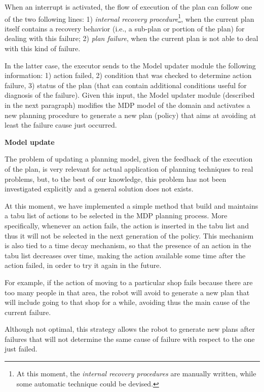 When an interrupt is activated, the flow of execution of the plan can follow one of the two following lines: 1) \emph{internal recovery procedure}\footnote{At this moment, the \emph{internal recovery procedures} are manually written, while some automatic technique could be devised.}, when the current plan itself contains a recovery behavior (i.e., a sub-plan or portion of the plan) for dealing with this failure; 2) \emph{plan failure}, when the current plan is not able to deal with this kind of failure.

In the latter case, the executor sends to the Model updater module the following information:
1) action failed, 2) condition that was checked to determine action failure, 3) status of the plan (that can contain additional conditions useful for diagnosis of the failure).
Given this input, the Model updater module (described in the next paragraph) modifies the MDP model of the domain and activates a new planning procedure to generate a new plan (policy) that aims at avoiding at least the failure cause just occurred.

\vspace{1em}

\noindent
{\bf Model update}

The problem of updating a planning model, given the feedback of the execution of the plan, is very relevant for actual application of planning techniques to real problems, but, to the best of our knowledge, this problem has not been investigated explicitly and a general solution does not exists.

At this moment, we have implemented a simple method that build and maintains a tabu list of actions to be selected in the MDP planning process.
More specifically, whenever an action fails, the action is inserted in the tabu list and thus it will not be selected in the next generation of the policy.
This mechanism is also tied to a time decay mechanism, so that the presence of an action in the tabu list decreases over time, making the action available some time after the action failed, in order to try it again in the future.

For example, if the action of moving to a particular shop fails because there are too many people in that area, the robot will avoid to generate a new plan that will include going to that shop for a while, avoiding thus the main cause of the current failure.

Although not optimal, this strategy allows the robot to generate new plans after failures that will not determine the same cause of failure with respect to the one just failed. 






